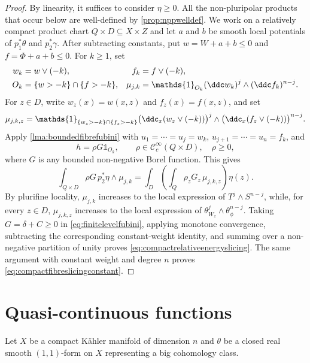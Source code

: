 \begin{proof}
    By linearity, it suffices to consider $\eta\geq0$.
    All the non-pluripolar products that occur below are well-defined by \cref{prop:nppwelldef}.
    We work on a relatively compact product chart $Q\times D\subseteq X\times Z$ and let $a$ and $b$ be smooth local potentials of $p_1^*\theta$ and $p_2^*\gamma$. After subtracting constants, put $w=W+a+b\leq0$ and $f=\Phi+a+b\leq0$. For $k\geq1$, set
    \[
        \begin{aligned}
        w_k&=w\lor(-k),& f_k&=f\lor(-k),\\
        O_k&=\{w>-k\}\cap\{f>-k\},&
        \mu_{j,k}&=\mathds{1}_{O_k}(\ddc w_k)^j\wedge(\ddc f_k)^{n-j}.
        \end{aligned}
    \]
    For $z\in D$, write $w_z(x)=w(x,z)$ and $f_z(x)=f(x,z)$, and set
    \[
        \mu_{j,k,z}
        =\mathds{1}_{\{w_z>-k\}\cap\{f_z>-k\}}
        \bigl(\ddc_x(w_z\lor(-k))\bigr)^j\wedge
        \bigl(\ddc_x(f_z\lor(-k))\bigr)^{n-j}.
    \]
    Apply \cref{lma:boundedfibrefubini} with $u_1=\cdots=u_j=w_k$, $u_{j+1}=\cdots=u_n=f_k$, and
    \[
        h=\rho G\mathds{1}_{O_k},\qquad
        \rho\in\mathcal{C}^{\infty}_c(Q\times D),\quad \rho\geq0,
    \]
    where $G$ is any bounded non-negative Borel function. This gives
    \begin{equation}\label{eq:finitelevelfubini}
        \int_{Q\times D}\rho G\,p_2^*\eta\wedge\mu_{j,k}
        =\int_D\left(\int_Q\rho_zG_z\,\mu_{j,k,z}\right)\eta(z).
    \end{equation}
    By plurifine locality, $\mu_{j,k}$ increases to the local expression of $T^j\wedge S^{n-j}$, while, for every $z\in D$, $\mu_{j,k,z}$ increases to the local expression of $\theta_{W_z}^j\wedge\theta_\phi^{n-j}$. Taking $G=\delta+C\geq0$ in \eqref{eq:finitelevelfubini}, applying monotone convergence, subtracting the corresponding constant-weight identity, and summing over a non-negative partition of unity proves \eqref{eq:compactrelativeenergyslicing}. The same argument with constant weight and degree $n$ proves \eqref{eq:compactfibreslicingconstant}.
\end{proof}

\section{Quasi-continuous functions}\label{sec:qc}

Let $X$ be a compact Kähler manifold of dimension $n$ and $\theta$ be a closed real smooth $(1,1)$-form on $X$ representing a big cohomology class.

